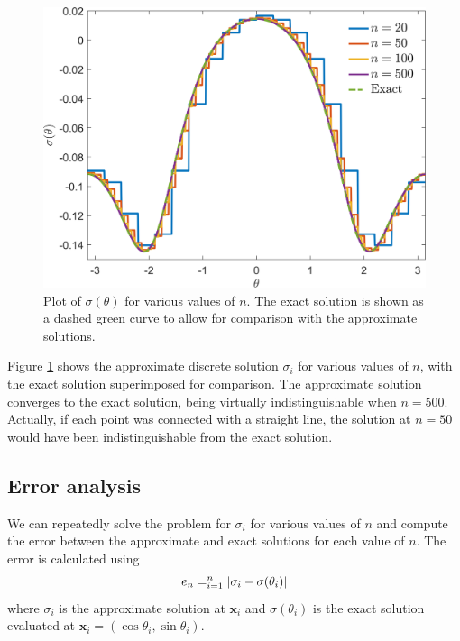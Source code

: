 \documentclass[11pt]{article}
\let\sumop\relax
\begin{document}
\begin{figure}[!htb]
  \centering
  \includegraphics[width=\linewidth]{sigma_solution.png}
  \caption{Plot of $\sigma(\theta)$ for various values of $n$. The exact solution is shown as a dashed green curve to allow for comparison with the approximate solutions.}
  \label{fig:sigma_solution}
\end{figure}

Figure \ref{fig:sigma_solution} shows the approximate discrete solution $\sigma_i$ for various values of $n$, with the exact solution superimposed for comparison. The approximate solution converges to the exact solution, being virtually indistinguishable when $n=500$. Actually, if each point was connected with a straight line, the solution at $n=50$ would have been indistinguishable from the exact solution.

\subsection{Error analysis}
We can repeatedly solve the problem for $\sigma_i$ for various values of $n$ and compute the error between the approximate and exact solutions for each value of $n$. The error is calculated using
\begin{equation*}
  e_n = \sumop_{i=1}^n \lvert \sigma_i - \sigma(\theta_i) \rvert
\end{equation*}
where $\sigma_i$ is the approximate solution at $\bm{x}_i$ and $\sigma(\theta_i)$ is the exact solution evaluated at $\bm{x}_i = (\cos\theta_i, \sin\theta_i)$.
\end{document}
